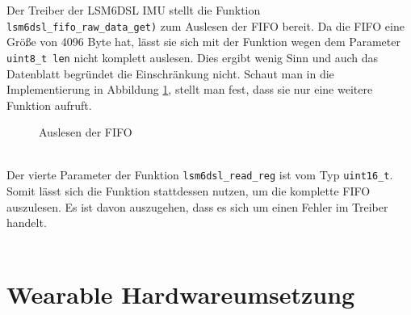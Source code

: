 Der Treiber der LSM6DSL IMU stellt die Funktion \texttt{lsm6dsl\_fifo\_raw\_data\_get)} zum Auslesen der FIFO bereit.
Da die FIFO eine Größe von 4096 Byte hat, lässt sie sich mit der Funktion wegen dem Parameter \texttt{uint8\_t len} nicht komplett auslesen.
Dies ergibt wenig Sinn und auch das Datenblatt begründet die Einschränkung nicht.
Schaut man in die Implementierung in Abbildung \ref{lst:fifoRead}, stellt man fest, dass sie nur eine weitere Funktion aufruft.
\begin{figure}[h!]

	\caption{Auslesen der FIFO}
	\label{lst:fifoRead}
\end{figure}\\
Der vierte Parameter der Funktion \texttt{lsm6dsl\_read\_reg} ist vom Typ \texttt{uint16\_t}.
Somit lässt sich die Funktion stattdessen nutzen, um die komplette FIFO auszulesen.
Es ist davon auszugehen, dass es sich um einen Fehler im Treiber handelt.\\\\






\section{Wearable Hardwareumsetzung}


